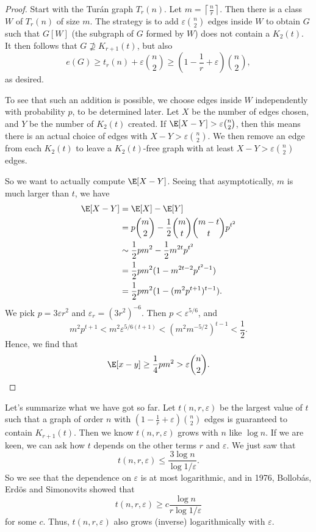 \documentclass[a4paper]{article}
\begin{document}
\begin{proof}
  Start with the Tur\'an graph $T_r(n)$. Let $m = \left\lceil \frac{n}{r} \right\rceil$. Then there is a class $W$ of $T_r(n)$ of size $m$. The strategy is to add $\varepsilon \binom{n}{2}$ edges inside $W$ to obtain $G$ such that $G[W]$ (the subgraph of $G$ formed by $W$) does not contain a $K_2(t)$. It then follows that $G \not\supseteq K_{r + 1}(t)$, but also
  \[
    e(G) \geq t_r(n) + \varepsilon \binom{n}{2} \geq \left(1 - \frac{1}{r} +\varepsilon \right) \binom{n}{2},
  \]
  as desired.

  To see that such an addition is possible, we choose edges inside $W$ independently with probability $p$, to be determined later. Let $X$ be the number of edges chosen, and $Y$ be the number of $K_2(t)$ created. If $\E[X - Y] > \varepsilon \binom{n}{2}$, then this means there is an actual choice of edges with $X - Y > \varepsilon \binom{n}{2}$. We then remove an edge from each $K_2(t)$ to leave a $K_2(t)$-free graph with at least $X - Y > \varepsilon \binom{n}{2}$ edges.

  So we want to actually compute $\E[X - Y]$. Seeing that asymptotically, $m$ is much larger than $t$, we have
  \begin{align*}
    \E[X - Y] &= \E[X] - \E[Y] \\
    &= p\binom{m}{2} - \frac{1}{2}\binom{m}{t} \binom{m - t}{t} p^{t^2}\\
    &\sim \frac{1}{2} pm^2 - \frac{1}{2} m^{2t} p^{t^2}\\
    &= \frac{1}{2} pm^2 (1 - m^{2t - 2} p^{t^2 - 1})\\
    &= \frac{1}{2} pm^2 (1 - (m^2 p^{t + 1})^{t - 1}).
  \end{align*}
  We pick $p = 3 \varepsilon r^2$ and $\varepsilon_r = (3r^2)^{-6}$. Then $p < \varepsilon^{5/6}$, and
  \[
    m^2 p^{t + 1} < m^2 \varepsilon^{5/6 (t + 1)} < (m^2 m^{-5/2})^{t - 1} < \frac{1}{2}. %
  \]
  Hence, we find that
  \[
    \E[x - y] \geq \frac{1}{4} p m^2 > \varepsilon \binom{n}{2}.
  \]
\end{proof}

Let's summarize what we have got so far. Let $t(n, r, \varepsilon)$ be the largest value of $t$ such that a graph of order $n$ with $\left(1 - \frac{1}{r} + \varepsilon \right) \binom{n}{2}$ edges is guaranteed to contain $K_{r + 1}(t)$. Then we know $t(n, r, \varepsilon)$ grows with $n$ like $\log n$. If we are keen, we can ask how $t$ depends on the other terms $r$ and $\varepsilon$. We just saw that
\[
  t(n, r, \varepsilon) \leq \frac{3 \log n}{\log 1/\varepsilon}.
\]
So we see that the dependence on $\varepsilon$ is at most logarithmic, and in 1976, Bollob\'as, Erd\"os and Simonovits showed that
\[
  t(n, r, \varepsilon) \geq c \frac{\log n}{r \log 1/\varepsilon}
\]
for some $c$. Thus, $t(n, r, \varepsilon)$ also grows (inverse) logarithmically with $\varepsilon$.
\end{document}
